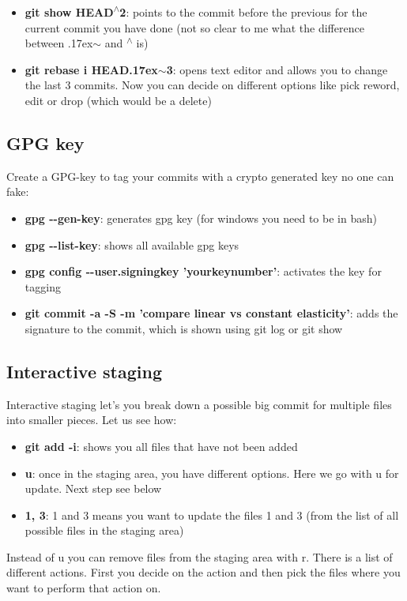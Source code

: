 \documentclass[12pt]{article}
\begin{document}
\begin {itemize}
\item \textbf{git show HEAD\textsuperscript{$\wedge$}2}: points to the commit before the previous for the current commit you have done (not so clear to me what the difference between {\raise.17ex\hbox{$\scriptstyle\mathtt{\sim}$}} and  \textsuperscript{$\wedge$} is)
\item \textbf{git rebase i HEAD{\raise.17ex\hbox{$\scriptstyle\mathtt{\sim}$}}3}: opens text editor and allows you to change the last 3 commits. Now you can decide on different options like pick reword, edit or drop (which would be a delete)
\end{itemize}

\subsection{GPG key}
Create a GPG-key to tag your commits with a crypto generated key no one can fake:
\begin {itemize}
\item \textbf{gpg \textrm{-}\textrm{-}gen-key}: generates gpg key (for windows you need to be in bash)
\item \textbf{gpg \textrm{-}\textrm{-}list-key}: shows all available gpg keys
\item \textbf{gpg config \textrm{-}\textrm{-}user.signingkey 'yourkeynumber'}: activates the key for tagging  
\item \textbf{git commit -a -S -m 'compare linear vs constant elasticity'}: adds the signature to the commit, which is shown using git log or git show 
\end{itemize}

\subsection{Interactive staging}
Interactive staging let's you break down a possible big commit for multiple files into smaller pieces. Let us see how:
\begin {itemize}
\item \textbf{git add -i}: shows you all files that have not been added 
\item \textbf{u}: once in the staging area, you have different options. Here we go with u for update. Next step see below
\item \textbf{1, 3}: 1 and 3 means you want to update the files 1 and 3 (from the list of all possible files in the staging area)
\end{itemize}
Instead of u you can remove files from the staging area with r. There is a list of different actions. First you decide on the action and then pick the files where you want to perform that action on.
\end{document}
